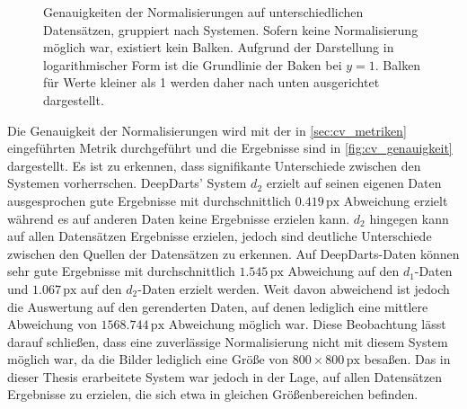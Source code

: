 \Similarities

\begin{figure}
    \centering
    \caption{Genauigkeiten der Normalisierungen auf unterschiedlichen Datensätzen, gruppiert nach Systemen. Sofern keine Normalisierung möglich war, existiert kein Balken. Aufgrund der Darstellung in logarithmischer Form ist die Grundlinie der Baken bei $y=1$. Balken für Werte kleiner als 1 werden daher nach unten ausgerichtet dargestellt.}
    \label{fig:cv_genauigkeit}
\end{figure}

Die Genauigkeit der Normalisierungen wird mit der in \autoref{sec:cv_metriken} eingeführten Metrik durchgeführt und die Ergebnisse sind in \autoref{fig:cv_genauigkeit} dargestellt. Es ist zu erkennen, dass signifikante Unterschiede zwischen den Systemen vorherrschen. DeepDarts' System $d_2$ erzielt auf seinen eigenen Daten ausgesprochen gute Ergebnisse mit durchschnittlich $0.419\,\text{px}$ Abweichung erzielt während es auf anderen Daten keine Ergebnisse erzielen kann. $d_2$ hingegen kann auf allen Datensätzen Ergebnisse erzielen, jedoch sind deutliche Unterschiede zwischen den Quellen der Datensätzen zu erkennen. Auf DeepDarts-Daten können sehr gute Ergebnisse mit durchschnittlich $1.545\,\text{px}$ Abweichung auf den $d_1$-Daten und $1.067\,\text{px}$ auf den $d_2$-Daten erzielt werden. Weit davon abweichend ist jedoch die Auswertung auf den gerenderten Daten, auf denen lediglich eine mittlere Abweichung von $1568.744\,\text{px}$ Abweichung möglich war.
Diese Beobachtung lässt darauf schließen, dass eine zuverlässige Normalisierung nicht mit diesem System möglich war, da die Bilder lediglich eine Größe von $800 \times 800\,\text{px}$ besaßen.
Das in dieser Thesis erarbeitete System war jedoch in der Lage, auf allen Datensätzen Ergebnisse zu erzielen, die sich etwa in gleichen Größenbereichen befinden.

